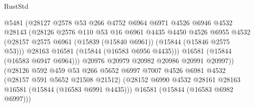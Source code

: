 \begin{lexlean}{RustStd}
\begin{coremodule}
                                  @5481
                                  (@28127
                                    @2578
                                    @53
                                    @266
                                    @4752
                                    @6964
                                    @6971
                                    @4526
                                    @6946
                                    @4532
                                    @28143
                                    (@28126
                                      @2576
                                      @110
                                      @53
                                      @16
                                      @6961
                                      @4435
                                      @4450
                                      @4526
                                      @6955
                                      @4532
                                      (@28157
                                        @2575
                                        @6961
                                        (@15839 (@15840 @6961))
                                        (@15844 (@15846 @2575 @53)))
                                      @28163
                                      @16581
                                      (@15844 (@16583 @6956 @4435)))
                                    @16581
                                    (@15844 (@16583 @6947 @6964)))
                                  @20976
                                  @20979
                                  @20982
                                  @20986
                                  @20991
                                  @20997))
                              (@28126
                                @592
                                @459
                                @53
                                @266
                                @5652
                                @6997
                                @7007
                                @4526
                                @6981
                                @4532
                                (@28157 @591 @5652 @21508 @21512)
                                (@28152
                                  @6990
                                  @4532
                                  @28161
                                  @28163
                                  @16581
                                  (@15844 (@16583 @6991 @4435)))
                                @16581
                                (@15844 (@16583 @6982 @6997)))

\end{coremodule}
\end{lexlean}
